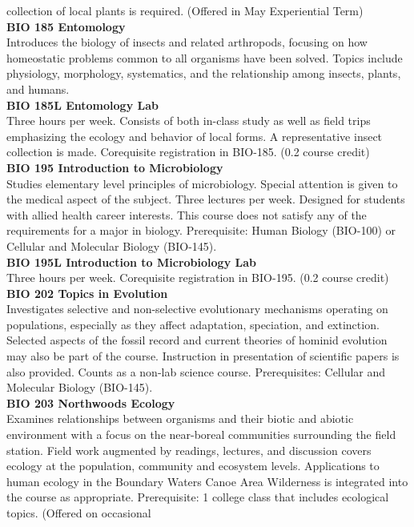 \documentclass[
  letterpaper,
]{scrbook}
\begin{document}
collection of local plants is required. (Offered in May Experiential
Term)\\
\textbf{BIO 185 Entomology}\\
Introduces the biology of insects and related arthropods, focusing on
how homeostatic problems common to all organisms have been solved.
Topics include physiology, morphology, systematics, and the relationship
among insects, plants, and humans.\\
\textbf{BIO 185L Entomology Lab}\\
Three hours per week. Consists of both in-class study as well as field
trips emphasizing the ecology and behavior of local forms. A
representative insect collection is made. Corequisite registration in
BIO-185. (0.2 course credit)\\
\textbf{BIO 195 Introduction to Microbiology}\\
Studies elementary level principles of microbiology. Special attention
is given to the medical aspect of the subject. Three lectures per week.
Designed for students with allied health career interests. This course
does not satisfy any of the requirements for a major in biology.
Prerequisite: Human Biology (BIO-100) or Cellular and Molecular Biology
(BIO-145).\\
\textbf{BIO 195L Introduction to Microbiology Lab}\\
Three hours per week. Corequisite registration in BIO-195. (0.2 course
credit)\\
\textbf{BIO 202 Topics in Evolution}\\
Investigates selective and non-selective evolutionary mechanisms
operating on populations, especially as they affect adaptation,
speciation, and extinction. Selected aspects of the fossil record and
current theories of hominid evolution may also be part of the course.
Instruction in presentation of scientific papers is also provided.
Counts as a non-lab science course. Prerequisites: Cellular and
Molecular Biology (BIO-145).\\
\textbf{BIO 203 Northwoods Ecology}\\
Examines relationships between organisms and their biotic and abiotic
environment with a focus on the near-boreal communities surrounding the
field station. Field work augmented by readings, lectures, and
discussion covers ecology at the population, community and ecosystem
levels. Applications to human ecology in the Boundary Waters Canoe Area
Wilderness is integrated into the course as appropriate. Prerequisite: 1
college class that includes ecological topics. (Offered on occasional
\end{document}

